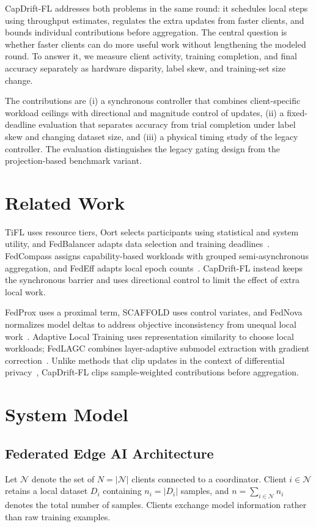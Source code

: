 \documentclass[conference]{IEEEtran}
\begin{document}
CapDrift-FL addresses both problems in the same round: it schedules local steps using throughput estimates, regulates the extra updates from faster clients, and bounds individual contributions before aggregation. The central question is whether faster clients can do more useful work without lengthening the modeled round. To answer it, we measure client activity, training completion, and final accuracy separately as hardware disparity, label skew, and training-set size change.

The contributions are (i) a synchronous controller that combines client-specific workload ceilings with directional and magnitude control of updates, (ii) a fixed-deadline evaluation that separates accuracy from trial completion under label skew and changing dataset size, and (iii) a physical timing study of the legacy controller. The evaluation distinguishes the legacy gating design from the projection-based benchmark variant.

\section{Related Work}
\label{sec:related}
TiFL uses resource tiers, Oort selects participants using statistical and system utility, and FedBalancer adapts data selection and training deadlines~\cite{chai2020tifl,lai2021oort,shin2022fedbalancer}. FedCompass assigns capability-based workloads with grouped semi-asynchronous aggregation, and FedEff adapts local epoch counts~\cite{li2024fedcompass,narmadha2025fedeff}. CapDrift-FL instead keeps the synchronous barrier and uses directional control to limit the effect of extra local work.

FedProx uses a proximal term, SCAFFOLD uses control variates, and FedNova normalizes model deltas to address objective inconsistency from unequal local work~\cite{li2020fedprox,karimireddy2020scaffold,wang2020fednova}. Adaptive Local Training uses representation similarity to choose local workloads; FedLAGC combines layer-adaptive submodel extraction with gradient correction~\cite{shenaj2025alt,hu2026fedlagc}. Unlike methods that clip updates in the context of differential privacy~\cite{andrew2021clipping}, CapDrift-FL clips sample-weighted contributions before aggregation.

\section{System Model}
\label{sec:model}
\subsection{Federated Edge AI Architecture}\label{subsec:architecture}
Let $\mathcal{N}$ denote the set of $N=|\mathcal{N}|$ clients connected to a coordinator. Client $i\in\mathcal{N}$ retains a local dataset $D_i$ containing $n_i=|D_i|$ samples, and $n=\sum_{i\in\mathcal{N}}n_i$ denotes the total number of samples. Clients exchange model information rather than raw training examples.
\end{document}
